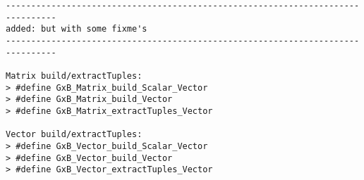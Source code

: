 \begin{verbatim}
--------------------------------------------------------------------------------
added: but with some fixme's
--------------------------------------------------------------------------------

Matrix build/extractTuples:
> #define GxB_Matrix_build_Scalar_Vector
> #define GxB_Matrix_build_Vector
> #define GxB_Matrix_extractTuples_Vector

Vector build/extractTuples:
> #define GxB_Vector_build_Scalar_Vector
> #define GxB_Vector_build_Vector
> #define GxB_Vector_extractTuples_Vector


\end{verbatim}


